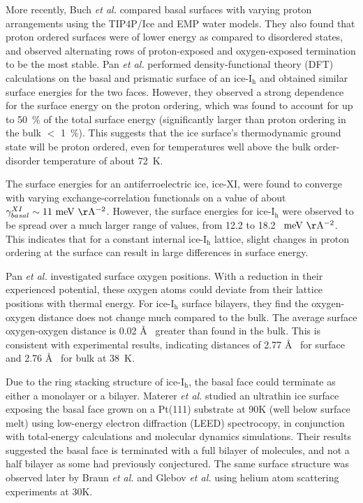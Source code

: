 More recently, Buch \textit{et al.} compared basal surfaces with
varying proton arrangements using the TIP4P/Ice and EMP water
models.\cite{Buch2008} They also found that proton ordered surfaces
were of lower energy as compared to disordered states, and observed
alternating rows of proton-exposed and oxygen-exposed termination to
be the most stable.  Pan \textit{et al.} performed density-functional
theory (DFT) calculations on the basal and prismatic surface of an
ice-I$_\mathrm{h}$ and obtained similar surface energies for the two
faces.\cite{Pan2010} However, they observed a strong dependence for
the surface energy on the proton ordering, which was found to account
for up to 50~\% of the total surface energy (significantly larger than
proton ordering in the bulk $<$ 1~\%). This suggests that the ice
surface's thermodynamic ground state will be proton ordered, even for
temperatures well above the bulk order-disorder temperature of about
72~K.

The surface energies for an antiferroelectric ice, ice-XI, were found
to converge with varying exchange-correlation functionals on a value
of about $\gamma_{basal}^{XI} \sim 11~\mathrm{meV~\AA^{-2}}$. However,
the surface energies for ice-I$_\mathrm{h}$ were observed to be spread
over a much larger range of values, from 12.2 to 18.2~
$\mathrm{meV~\AA^{-2}}$. This indicates that for a constant internal
ice-I$_\mathrm{h}$ lattice, slight changes in proton ordering at the
surface can result in large differences in surface energy.

Pan \textit{et al.} investigated surface oxygen
positions. \cite{Pan2010} With a reduction in their experienced
potential, these oxygen atoms could deviate from their lattice
positions with thermal energy. For ice-I$_\mathrm{h}$ surface
bilayers, they find the oxygen-oxygen distance does not change much
compared to the bulk. The average surface oxygen-oxygen distance is
0.02 \AA~ greater than found in the bulk. This is consistent with
experimental results, indicating distances of 2.77 \AA~ for surface
and 2.76 \AA~ for bulk at 38~K.\cite{Parent2002}

Due to the ring stacking structure of ice-I$_\mathrm{h}$, the basal
face could terminate as either a monolayer or a bilayer. Materer
\textit{et al.} studied an ultrathin ice surface exposing the basal
face grown on a Pt(111) substrate at 90K (well below surface melt)
using low-energy electron diffraction (LEED) spectrocopy, in
conjunction with total-energy calculations and molecular dynamics
simulations.\cite{Materer1995,Materer1997} Their results suggested the
basal face is terminated with a full bilayer of molecules, and not a
half bilayer as some had previously conjectured. The same surface
structure was observed later by Braun \textit{et al.}\cite{Braun1998}
and Glebov \textit{et al.}\cite{Glebov2000} using helium atom
scattering experiments at 30K.

